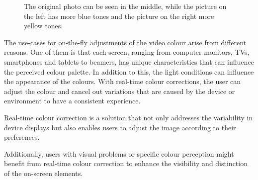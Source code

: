 \documentclass[../MasterThesis.tex]{subfiles}
\begin{document}
	
	\begin{figure}[H]
		\begin{center}
			\caption[Photo in different colour tones]{The original photo can be seen in the middle, while the picture on the left has more blue tones and the picture on the right more yellow tones.}
			\label{figure:coloursblueandyellow}
		\end{center}
	\end{figure}
	The use-cases for on-the-fly adjustments of the video colour arise from different reasons. 
	One of them is that each screen, ranging from computer monitors, TVs, smartphones and tablets to beamers, has unique characteristics that can influence the perceived colour palette. 
	In addition to this, the light conditions can influence the appearance of the colours.
	With real-time colour corrections, the user can adjust the colour and cancel out variations that are caused by the device or environment to have a consistent experience.
	
	Real-time colour correction is a solution that not only addresses the variability in device displays but also enables users to adjust the image according to their preferences.
	
	Additionally, users with visual problems or specific colour perception might benefit from real-time colour correction to enhance the visibility and distinction of the on-screen elements. 
	
	
	
	
	
	
	
\end{document}
